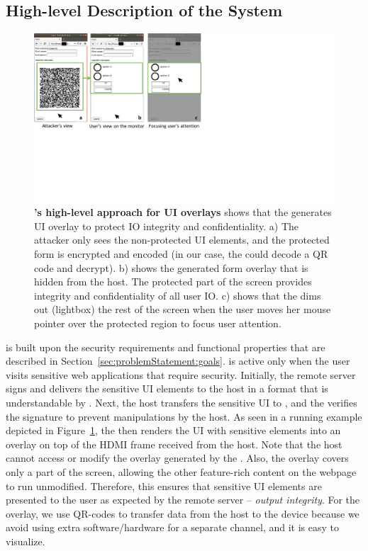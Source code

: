 \subsection{High-level Description of the System}

\begin{figure}[t]
\centering
\includegraphics[trim={0 8cm 15cm 0}, clip, width=\linewidth]{chapters/ProtectIOn/images/overlayScreenShot_new.pdf}
\caption[\name's high-level approach for UI overlays]{\textbf{\name's high-level approach for UI overlays} shows that the \device generates UI overlay to protect IO integrity and confidentiality. a) The attacker only sees the non-protected UI elements, and the protected form is encrypted and encoded (in our case, the \device could decode a QR code and decrypt). b) shows the \device generated form overlay that is hidden from the host. The protected part of the screen provides integrity and confidentiality of all user IO. c) shows that the \device dims out (lightbox) the rest of the screen when the user moves her mouse pointer over the protected region to focus user attention.}

\label{fig:screenshot_1}
\end{figure}

\name is built upon the security requirements and functional properties that are described in Section~\ref{sec:problemStatement:goals}.
\device is active only when the user visits sensitive web applications that require \name security.
Initially, the remote server signs and delivers the sensitive UI elements to the host in a format that is understandable by \device. Next, the host transfers the sensitive UI to \device, and the \device verifies the signature to prevent manipulations by the host. As seen in a running example depicted in Figure~\ref{fig:screenshot_1}, the \device then renders the UI with sensitive elements into an overlay on top of the HDMI frame received from the host. Note that the host cannot access or modify the overlay generated by the \device. Also, the overlay covers only a part of the screen, allowing the other feature-rich content on the webpage to run unmodified. Therefore, this ensures that sensitive UI elements are presented to the user as expected by the remote server -- \emph{output integrity}. For the overlay, we use QR-codes to transfer data from the host to the device because we avoid using extra software/hardware for a separate channel, and it is easy to visualize.

